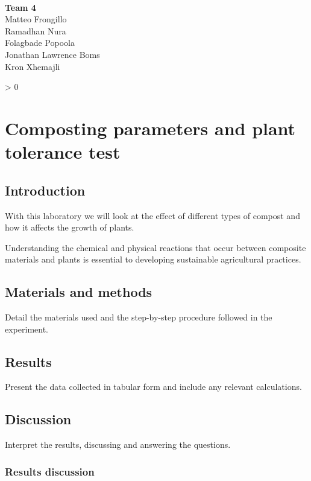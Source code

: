 \documentclass{article}
\makeatletter
\newcommand{\wrapfill}{
    \par
    \ifnum \value{WF@wrappedlines} > 0
        \addtocounter{WF@wrappedlines}{-1}%
        \null\vspace{
            \arabic{WF@wrappedlines}
            \baselineskip
        }
        \WFclear
    \fi
    \phantom{}
}
\makeatother
\begin{document}
\phantom{}\\[-1cm]

\begin{flushright}
        \large
        \textbf{Team 4}\\
        Matteo Frongillo\\
        Ramadhan Nura\\
        Folagbade Popoola\\
        Jonathan Lawrence Boms\\
        Kron Xhemajli
\end{flushright}
\wrapfill

\tableofcontents
\pagebreak

\section{Composting parameters and plant tolerance test}
\subsection{Introduction}
With this laboratory we will look at the effect of different types of
compost and how it affects the growth of plants. 

Understanding the chemical and physical reactions that occur between
composite materials and plants is essential to developing sustainable
agricultural practices.

\subsection{Materials and methods}
Detail the materials used and the step-by-step procedure followed in the experiment.

\subsection{Results}
Present the data collected in tabular form and include any relevant calculations.

\subsection{Discussion}
Interpret the results, discussing and answering the questions.

\subsubsection{Results discussion}
\end{document}
